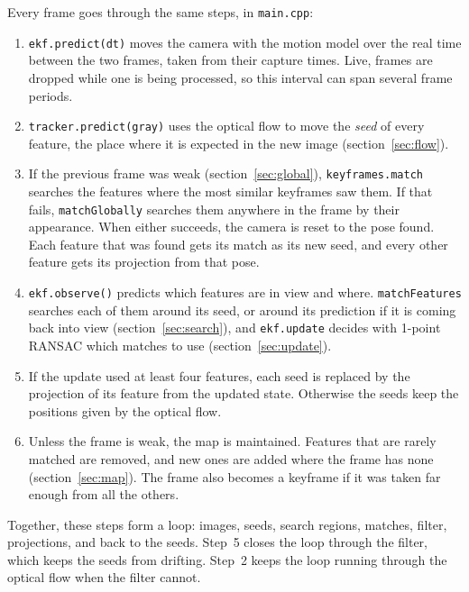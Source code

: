 \documentclass[11pt]{article}
\begin{document}
Every frame goes through the same steps, in \texttt{main.cpp}:
\begin{enumerate}
  \item \texttt{ekf.predict(dt)} moves the camera with the motion model over the real time between
        the two frames, taken from their capture times. Live, frames are dropped while one is being
        processed, so this interval can span several frame periods.
  \item \texttt{tracker.predict(gray)} uses the optical flow to move the \emph{seed} of every
        feature, the place where it is expected in the new image (section~\ref{sec:flow}).
  \item If the previous frame was weak (section~\ref{sec:global}), \texttt{keyframes.match}
        searches the features where the most similar keyframes saw them. If that fails,
        \texttt{matchGlobally} searches them anywhere in the frame by their appearance. When either
        succeeds, the camera is reset to the pose found. Each feature that was found gets its match
        as its new seed, and every other feature gets its projection from that pose.
  \item \texttt{ekf.observe()} predicts which features are in view and where. \texttt{matchFeatures}
        searches each of them around its seed, or around its prediction if it is coming back into
        view (section~\ref{sec:search}), and \texttt{ekf.update} decides with 1-point RANSAC which
        matches to use (section~\ref{sec:update}).
  \item If the update used at least four features, each seed is replaced by the projection of its
        feature from the updated state. Otherwise the seeds keep the positions given by the
        optical flow.
  \item Unless the frame is weak, the map is maintained. Features that are rarely matched are
        removed, and new ones are added where the frame has none (section~\ref{sec:map}). The frame
        also becomes a keyframe if it was taken far enough from all the others.
\end{enumerate}

Together, these steps form a loop: images, seeds, search regions, matches, filter, projections,
and back to the seeds. Step~5 closes the loop through the filter, which keeps the seeds from
drifting. Step~2 keeps the loop running through the optical flow when the filter cannot.
\end{document}
